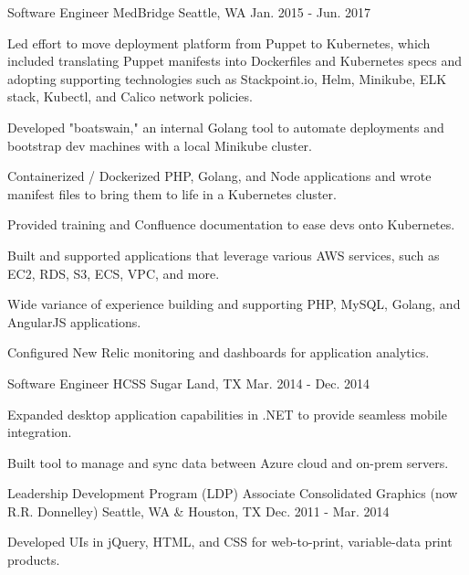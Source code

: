 \begin{cventries}

\cventry
{Software Engineer} %
{MedBridge} %
{Seattle, WA} %
{Jan. 2015 - Jun. 2017} %
{ %
\begin{cvitems}
\item {Led effort to move deployment platform from Puppet to Kubernetes, which included translating Puppet manifests into Dockerfiles and Kubernetes specs and  adopting supporting technologies such as Stackpoint.io, Helm, Minikube, ELK stack, Kubectl, and Calico network policies.}
\item {Developed "boatswain," an internal Golang tool to automate deployments and bootstrap dev machines with a local Minikube cluster.}
\item {Containerized / Dockerized PHP, Golang, and Node applications and wrote manifest files to bring them to life in a Kubernetes cluster.}
\item {Provided training and Confluence documentation to ease devs onto Kubernetes.}
\item {Built and supported applications that leverage various AWS services, such as EC2, RDS, S3, ECS, VPC, and more.}
\item {Wide variance of experience building and supporting PHP, MySQL, Golang, and AngularJS applications.}
\item {Configured New Relic monitoring and dashboards for application analytics.}
\end{cvitems} 
}


\cventry
{Software Engineer} %
{HCSS} %
{Sugar Land, TX} %
{Mar. 2014 - Dec. 2014} %
{ %
\begin{cvitems}
\item {Expanded desktop application capabilities in .NET to provide seamless mobile integration.}
\item {Built tool to manage and sync data between Azure cloud and on-prem servers.}
\end{cvitems}
}


\cventry
{Leadership Development Program (LDP) Associate} %
{Consolidated Graphics (now R.R. Donnelley)} %
{Seattle, WA \& Houston, TX} %
{Dec. 2011 - Mar. 2014} %
{ %
\begin{cvitems}
\item {Developed UIs in jQuery, HTML, and CSS for web-to-print, variable-data print products.}
\end{cvitems}
}

\end{cventries}

